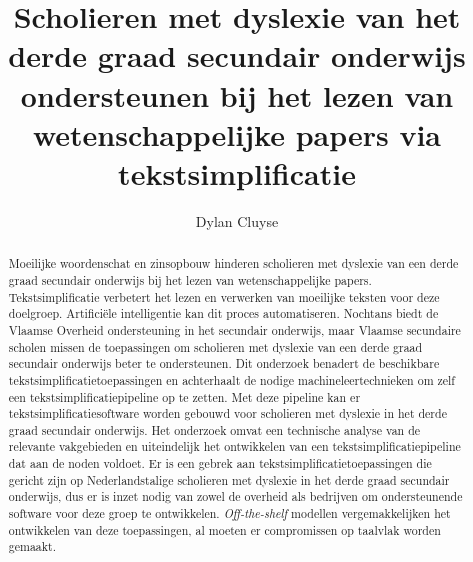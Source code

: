 \documentclass{hogent-article}
\title{Scholieren met dyslexie van het derde graad secundair onderwijs ondersteunen bij het lezen van wetenschappelijke papers via tekstsimplificatie}
\author{Dylan Cluyse}
\begin{document}
\begin{abstract}
Moeilijke woordenschat en zinsopbouw hinderen scholieren met dyslexie van een derde graad secundair onderwijs bij het lezen van wetenschappelijke papers. Tekstsimplificatie verbetert het lezen en verwerken van moeilijke teksten voor deze doelgroep. Artificiële intelligentie kan dit proces automatiseren. Nochtans biedt de Vlaamse Overheid ondersteuning in het secundair onderwijs, maar Vlaamse secundaire scholen missen de toepassingen om scholieren met dyslexie van een derde graad secundair onderwijs beter te ondersteunen. Dit onderzoek benadert de beschikbare tekstsimplificatietoepassingen en achterhaalt de nodige machineleertechnieken om zelf een tekstsimplificatiepipeline op te zetten. Met deze pipeline kan er tekstsimplificatiesoftware worden gebouwd voor scholieren met dyslexie in het derde graad secundair onderwijs. Het onderzoek omvat een technische analyse van de relevante vakgebieden en uiteindelijk het ontwikkelen van een tekstsimplificatiepipeline dat aan de noden voldoet. Er is een gebrek aan tekstsimplificatietoepassingen die gericht zijn op Nederlandstalige scholieren met dyslexie in het derde graad secundair onderwijs, dus er is inzet nodig van zowel de overheid als bedrijven om ondersteunende software voor deze groep te ontwikkelen. \textit{Off-the-shelf} modellen vergemakkelijken het ontwikkelen van deze toepassingen, al moeten er compromissen op taalvlak worden gemaakt.

\end{abstract}

\tableofcontents



\printbibliography[heading=bibintoc]
\end{document}
